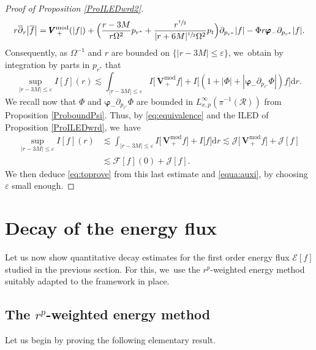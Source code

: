 \documentclass[10pt]{amsart}
\let\epsilon\varepsilon
\theoremstyle{plain}
\theoremstyle{definition}
\newcommand\dr{{\mathrm{d}}}
\begin{document}
\begin{proof}[Proof of Proposition \ref{ProILEDwrd2}]
\[
r \overline{\partial}_r\big|\overline{f}\big|= \pmb{V}_{\, +}^{ \mathrm{mod}}(|f|)+\Bigl(\frac{r-3M}{r\Omega^2}p_{r^*}+\frac{r^{\sfrac{1}{2}}}{|r+6M|^{\sfrac{1}{2}} \Omega^2}p_t \Bigr) \partial_{p_{r^*}}|f|-\Phi r \pmb{\varphi}_- \partial_{p_{r^*}}|f|.
\]
Consequently, as $\Omega^{-1}$ and $r$ are bounded on $\{|r-3M| \leq \epsilon \}$, we~obtain by integration by parts in $p_{r^*}$ that
\[
\sup_{|r-3M| \leq \epsilon } I[f](r) \lesssim \int_{|r-3M| \leq \epsilon} I\bigl[ \, \pmb{V}_{\, +}^{ \mathrm{mod}}f \bigr]+ I \bigl[(1+|\Phi|+|\pmb{\varphi}_-\partial_{p_{r^*}} \Phi|)f \bigr] \dr r.
\]
We recall now that $\Phi$ and $\pmb{\varphi}_-\partial_{p_{r^*}} \Phi$ are bounded in $L_{x,p}^\infty(\pi^{-1}(\mathcal{R}))$ from Proposition \ref{ProboundPsi}. Thus, by \eqref{eq:equivalence} and the ILED of Proposition \ref{ProILEDwrd}, we~have
\begin{align*}
\sup_{|r-3M| \leq \epsilon } I[f](r) & \lesssim \int_{|r-3M| \leq \epsilon} I \bigl[ \, \pmb{V}_{\, +}^{ \mathrm{mod}}f \bigr] + I \bigl[f \bigr] \dr r \lesssim \mathcal{J} \bigl[ \, \pmb{V}_{\, +}^{ \mathrm{mod}}f \bigr]+\mathcal{J}[f] \\
& \lesssim \mathcal{F}[f](0)+ \mathcal{J}[f].
\end{align*}
We then deduce \eqref{eq:toprove} from this last estimate and \eqref{equa:auxi}, by choosing $\epsilon$ small enough.
\end{proof}

\section{Decay of the energy flux}\label{Sec7}

Let us now show quantitative decay estimates for the first order energy flux $\mathcal{E}[f]$ studied in the previous section. For this, we~use the $r^p$-weighted energy method suitably adapted to the framework in place.

\subsection{The $r^p$-weighted energy method}

Let us begin by proving the following elementary result.
\end{document}
